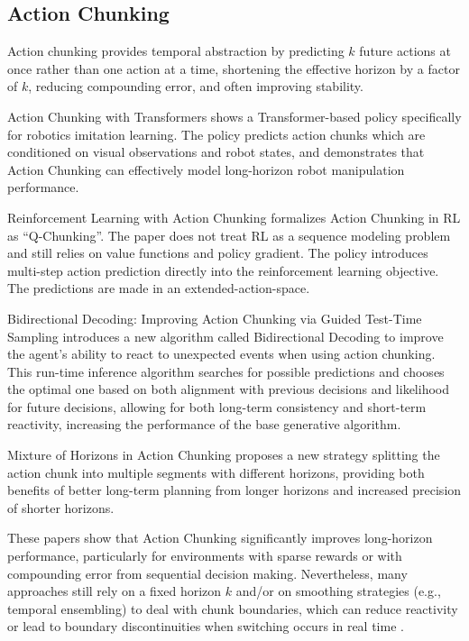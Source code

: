 \documentclass{article}
\begin{document}
\subsection{Action Chunking}

Action chunking provides temporal abstraction by predicting $k$ future actions at once rather than one action at a time, shortening the effective horizon by a factor of $k$, reducing compounding error, and often improving stability.

Action Chunking with Transformers \cite{zhao2023} shows a Transformer-based policy specifically for robotics imitation learning. The policy predicts action chunks which are conditioned on visual observations and robot states, and demonstrates that Action Chunking can effectively model long-horizon robot manipulation performance. 

Reinforcement Learning with Action Chunking \cite{li2025reinforcementlearningactionchunking} formalizes Action Chunking in RL as ``Q-Chunking''. The paper does not treat RL as a sequence modeling problem and still relies on value functions and policy gradient. The policy introduces multi-step action prediction directly into the reinforcement learning objective. The predictions are made in an extended-action-space.

Bidirectional Decoding: Improving Action Chunking via Guided Test-Time Sampling \cite{bidirect} introduces a new algorithm called Bidirectional Decoding to improve the agent's ability to react to unexpected events when using action chunking. This run-time inference algorithm searches for possible predictions and chooses the optimal one based on both alignment with previous decisions and likelihood for future decisions, allowing for both long-term consistency and short-term reactivity, increasing the performance of the base generative algorithm.

Mixture of Horizons in Action Chunking \cite{mixtureofhorizons} proposes a new strategy splitting the action chunk into multiple segments with different horizons, providing both benefits of better long-term planning from longer horizons and increased precision of shorter horizons. 

These papers show that Action Chunking significantly improves long-horizon performance, particularly for environments with sparse rewards or with compounding error from sequential decision making. Nevertheless, many approaches still rely on a fixed horizon $k$ and/or on smoothing strategies (e.g., temporal ensembling) to deal with chunk boundaries, which can reduce reactivity or lead to boundary discontinuities when switching occurs in real time \cite{real_time_chunking}.
\end{document}

